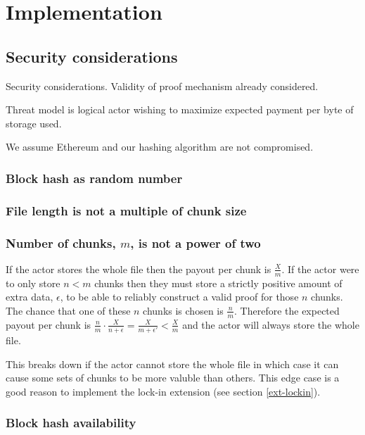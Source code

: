 \documentclass[10pt,twoside,a4paper]{article}
\begin{document}
\section{Implementation}

\subsection{Security considerations}

Security considerations.
Validity of proof mechanism already considered.

Threat model is logical actor wishing to maximize expected payment per byte of storage used.

We assume Ethereum and our hashing algorithm are not compromised.

\subsubsection{Block hash as random number}

\subsubsection{File length is not a multiple of chunk size}

\subsubsection{Number of chunks, $m$, is not a power of two}

If the actor stores the whole file then the payout per chunk is $\frac{X}{m}$.
If the actor were to only store $n < m$ chunks then they must store a strictly positive amount of extra data, $\epsilon$, to be able to reliably construct a valid proof for those $n$ chunks.
The chance that one of these $n$ chunks is chosen is $\frac{n}{m}$.
Therefore the expected payout per chunk is $\frac{n}{m} \cdot \frac{X}{n + \epsilon} = \frac{X}{m + \epsilon'} < \frac{X}{m}$
and the actor will always store the whole file.

This breaks down if the actor cannot store the whole file in which case it can cause some sets of chunks to be more valuble than others.
This edge case is a good reason to implement the lock-in extension (see section \ref{ext-lockin}).

\subsubsection{Block hash availability}
\end{document}
